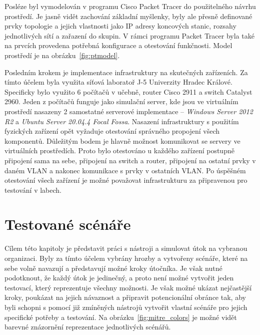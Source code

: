 
Posléze byl vymodelován v programu Cisco Packet Tracer do použitelného návrhu prostředí.
Je jasně vidět zachování základní myšlenky, byly ale přesně definované prvky topologie a jejich vlastnosti jako IP adresy koncových stanic, rozsahy jednotlivých sítí a zařazení do  skupin.
V rámci programu Packet Tracer byla také na prvcích provedena potřebná konfigurace a otestování funkčnosti.
Model prostředí je na obrázku~\ref{fig:ptmodel}.


Posledním krokem je implementace infrastruktury na skutečných zařízeních.
Za tímto účelem byla využita síťová laboratoř J-5 Univerzity Hradec Králové.
Specificky bylo využito 6 počítačů v učebně, router Cisco 2911 a switch Catalyst 2960.
Jeden z počítačů funguje jako simulační server, kde jsou ve virtuálním prostředí nasazeny 2 samostatné serverové implementace -- \textit{Windows Server 2012 R2} a \textit{Ubuntu Server 20.04.4 Focal Fossa}.
Nasazení infrastruktury s použitím fyzických zařízení opět vyžaduje otestování správného propojení všech komponentů.
Důležitým bodem je hlavně možnost komunikovat se servery ve virtuálních prostředích.
Proto bylo otestováno u každého zařízení postupně připojení sama na sebe, připojení na switch a router, připojení na ostatní prvky v daném \ac{VLAN} a nakonec komunikace s prvky v ostatních \ac{VLAN}.
Po úspěšném otestování všech zařízení je možné považovat infrastrukturu za připravenou pro testování v labech.

\section{Testované scénáře}\label{sec:testovane-scenare}
Cílem této kapitoly je představit práci s nástroji a simulovat útok na vybranou organizaci.
Byly za tímto účelem vybrány hrozby a vytvořeny scénáře, které na sebe volně navazují a představují možné kroky útočníka.
Je však nutné podotknout, že každý útok je jedinečný, a proto není možné vytvořit jeden testovací, který reprezentuje všechny možnosti.
Je však možné ukázat nejčastější kroky, poukázat na jejich návaznost a připravit potencionální obránce tak, aby byli schopni s pomocí již zmíněných nástrojů vytvořit vlastní scénáře pro jejich specifické potřeby a testování.
Na obrázku~\ref{fig:mitre_colors} je možné vidět barevné znázornění reprezentace jednotlivých scénářů.

